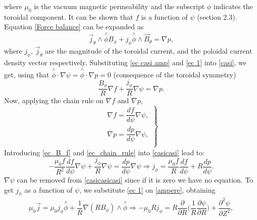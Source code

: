 \documentclass[a4paper,12pt,oneside]{book}
\newcommand{\p}{\partial}
\begin{document}
%
where $\mu_0$ is the vacuum magnetic permeability and the subscript $\phi$ indicates the toroidal component. It can be shown that $f$ is a function of $\psi$ \cite{Wesson} (section 2.3). Equation \eqref{Force balance} can be expanded as
%
\begin{equation}\label{casi}
\vec{j}_\theta \wedge \stackrel{\wedge}{\phi} B_\phi+j_\phi \stackrel{\wedge}{\phi} \wedge \vec{B}_\theta=\nabla p,
\end{equation}
%
where $j_\phi$, $\vec{j}_\theta$ are the magnitude of the toroidal current, and the poloidal current density vector respectively. Substituting \eqref{ec casi amp} and \eqref{ec 1} into \eqref{casi}, we get, using that $\stackrel{\wedge}{\phi} \cdot \nabla \psi=\stackrel{\wedge}{\phi} \cdot \nabla p=0$ (consequence of the toroidal symmetry)
%
\begin{equation}\label{casicasi}
\dfrac{B_\phi}{R} \nabla f + \dfrac{j_\phi}{R} \nabla \psi= \nabla p.
\end{equation}
Now, applying the chain rule on $\nabla f$ and $\nabla p$,
%
\begin{equation}\label{ec_chain_rule}
\left.
\begin{array}{c}
\nabla f=\dfrac{d f}{d \psi} \nabla \psi, \\
\nabla p=\dfrac{d p}{d \psi} \nabla \psi, \\
\end{array}
\right\}
\end{equation}
Introducing \eqref{ec_B_f} and \eqref{ec_chain_rule} into \eqref{casicasi} lead to:
%
\begin{equation}\label{casicasicasi}
-\dfrac{\mu_0 f}{R^2} \dfrac{d f}{d \psi} \nabla \psi + \dfrac{j_\phi}{R} \nabla \psi =  \dfrac{d p}{d \psi} \nabla \psi \Rightarrow j_\phi= \dfrac{\mu_0 f}{R} \dfrac{d f}{d \psi} +R\dfrac{d p}{d \psi}.
\end{equation}
$\nabla \psi$ can be removed from \eqref{casicasicasi} since if it is zero we have no equation.
To get $j_\phi$ as a function of $\psi$, we substitute \eqref{ec 1} on \eqref{ampere}, obtaining
%
\begin{equation}\label{ec jphi}
\begin{array}{c}
\mu_0 \vec{j}=\mu_0 j_\phi \stackrel{\wedge}{\phi}+\dfrac{1}{R} \nabla(R B_\phi) \wedge \stackrel{\wedge}{\phi} \Rightarrow
-\mu_0 R j_\phi=R \dfrac{\p }{\p R} \Big( \dfrac{1}{R} \dfrac{\p \psi}{\p R} \Big) +\dfrac{\p^2 \psi}{\p Z^2},
\end{array}
\end{equation}
\end{document}
